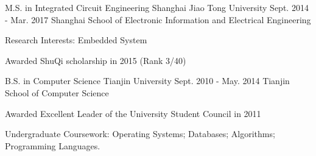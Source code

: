 \begin{cventries}
  \cventry
    {M.S. in Integrated Circuit Engineering}
    {Shanghai Jiao Tong University}
    {Sept. 2014 - Mar. 2017}
    {Shanghai}
    {School of Electronic Information and Electrical Engineering}
    {
      \begin{cvitems}
        \item {Research Interests: Embedded System}
        \item {Awarded ShuQi scholarship in 2015 (Rank 3/40)}
      \end{cvitems}
    }
    \cventry
    {B.S. in Computer Science}
    {Tianjin University}
    {Sept. 2010 - May. 2014}
    {Tianjin}
    {School of Computer Science}
    {
      \begin{cvitems}
        \item {Awarded Excellent Leader of the University Student Council in 2011}
        \item {Undergraduate Coursework: Operating Systems; Databases; Algorithms; Programming Languages.}
      \end{cvitems}
    }
\end{cventries}

